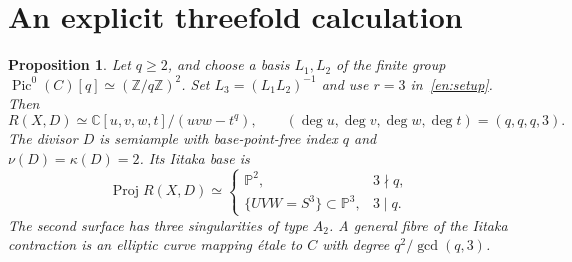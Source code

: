 \documentclass[12pt]{amsart}
\newtheorem{prop}[thm]{Proposition}
\theoremstyle{definition}
\theoremstyle{remark}
\numberwithin{equation}{section}
\newcommand{\Z}{\mathbb{Z}}
\newcommand{\C}{\mathbb{C}}
\newcommand{\mP}{\mathbb{P}}
\DeclareMathOperator{\Pic}{Pic}
\DeclareMathOperator{\Proj}{Proj}
\begin{document}
\section{An explicit threefold calculation}\label{en:three}
\begin{prop}\label{en:cubic}
Let $q\geq2$, and choose a basis $L_1,L_2$ of the finite group $\Pic^0(C)[q]\simeq(\Z/q\Z)^2$. Set $L_3=(L_1L_2)^{-1}$ and use $r=3$ in~\eqref{en:setup}. Then
\begin{equation}\label{en:cubicring}
 R(X,D)\simeq\C[u,v,w,t]/(uvw-t^q),\qquad
 (\deg u,\deg v,\deg w,\deg t)=(q,q,q,3).
\end{equation}
The divisor $D$ is semiample with base-point-free index $q$ and $\nu(D)=\kappa(D)=2$. Its Iitaka base is
\begin{equation}\label{en:bases}
 \Proj R(X,D)\simeq
 \begin{cases}
 \mP^2,&3\nmid q,\\
 \{UVW=S^3\}\subset\mP^3,&3\mid q.
 \end{cases}
\end{equation}
The second surface has three singularities of type $A_2$. A general fibre of the Iitaka contraction is an elliptic curve mapping \emph{\'etale} to $C$ with degree $q^2/\gcd(q,3)$.
\end{prop}
\end{document}
